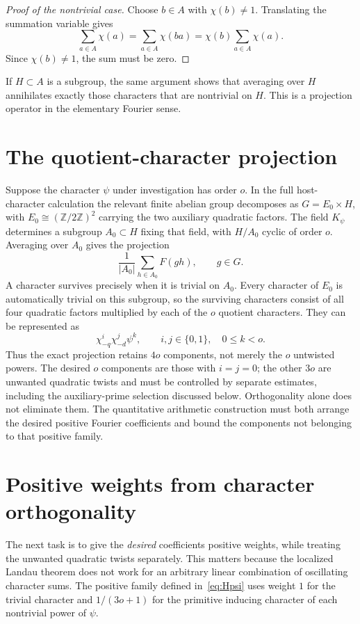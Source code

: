 \documentclass[11pt,openany,oneside]{scrbook}
\theoremstyle{definition}
\theoremstyle{remark}
\newcommand{\ZZ}{\mathbb Z}
\begin{document}
\begin{proof}[Proof of the nontrivial case]
Choose $b\in A$ with $\chi(b)\ne1$. Translating the summation variable gives
\[
\sum_{a\in A}\chi(a)
=\sum_{a\in A}\chi(ba)
=\chi(b)\sum_{a\in A}\chi(a).
\]
Since $\chi(b)\ne1$, the sum must be zero.
\end{proof}

If $H\subset A$ is a subgroup, the same argument shows that averaging over $H$ annihilates exactly those characters that are nontrivial on $H$. This is a projection operator in the elementary Fourier sense.

\section{The quotient-character projection}

Suppose the character $\psi$ under investigation has order $o$. In the full host-character calculation the relevant finite abelian group decomposes as $G=E_0\times H$, with $E_0\cong(\ZZ/2\ZZ)^2$ carrying the two auxiliary quadratic factors. The field $K_\psi$ determines a subgroup $A_0\subset H$ fixing that field, with $H/A_0$ cyclic of order $o$. Averaging over $A_0$ gives the projection
\[
\frac1{|A_0|}\sum_{h\in A_0}F(gh),\qquad g\in G.
\]
A character survives precisely when it is trivial on $A_0$. Every character of $E_0$ is automatically trivial on this subgroup, so the surviving characters consist of all four quadratic factors multiplied by each of the $o$ quotient characters. They can be represented as
\[
\chi_{-q}^{i}\chi_{-d}^{j}\psi^k,
\qquad i,j\in\{0,1\},\quad 0\le k<o.
\]
Thus the exact projection retains $4o$ components, not merely the $o$ untwisted powers. The desired $o$ components are those with $i=j=0$; the other $3o$ are unwanted quadratic twists and must be controlled by separate estimates, including the auxiliary-prime selection discussed below. Orthogonality alone does not eliminate them. The quantitative arithmetic construction must both arrange the desired positive Fourier coefficients and bound the components not belonging to that positive family.

\section{Positive weights from character orthogonality}

The next task is to give the \emph{desired} coefficients positive weights, while treating the unwanted quadratic twists separately. This matters because the localized Landau theorem does not work for an arbitrary linear combination of oscillating character sums. The positive family defined in~\eqref{eq:Hpsi} uses weight $1$ for the trivial character and $1/(3o+1)$ for the primitive inducing character of each nontrivial power of $\psi$.
\end{document}
